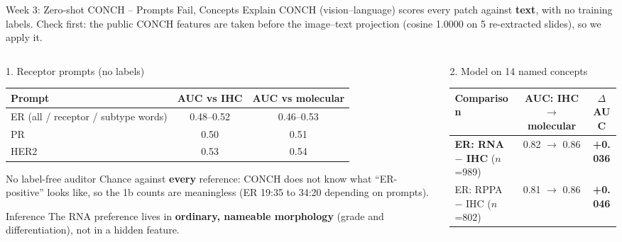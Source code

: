\documentclass[aspectratio=169,10pt]{beamer}
\begin{document}
\begin{frame}[t]{Week 3: Zero-shot CONCH -- Prompts Fail, Concepts Explain}
\footnotesize
CONCH (vision--language) scores every patch against \textbf{text}, with no training labels. Check first: the public
CONCH features are taken before the image--text projection (cosine 1.0000 on 5 re-extracted slides), so we apply it.

\vspace{4pt}
\begin{columns}[T]
\begin{column}{0.44\textwidth}
\begin{block}{1. Receptor prompts (no labels)}
\centering
\scriptsize
\begin{adjustbox}{max width=\linewidth}
\begin{tabular}{lcc}
\toprule
Prompt & AUC vs IHC & AUC vs molecular \\
\midrule
ER (all / receptor / subtype words) & 0.48--0.52 & 0.46--0.53 \\
PR & 0.50 & 0.51 \\
HER2 & 0.53 & 0.54 \\
\bottomrule
\end{tabular}
\end{adjustbox}
\end{block}
\begin{alertblock}{No label-free auditor}
Chance against \textbf{every} reference: CONCH does not know what ``ER-positive'' looks like, so the 1b counts are
meaningless (ER 19:35 to 34:20 depending on prompts).
\end{alertblock}
\begin{alertblock}{Inference}
The RNA preference lives in \textbf{ordinary, nameable morphology} (grade and differentiation), not in a hidden
feature.
\end{alertblock}
\end{column}
\begin{column}{0.53\textwidth}
\begin{block}{2. Model on 14 named concepts}
\centering
\scriptsize
\begin{adjustbox}{max width=\linewidth}
\begin{tabular}{lcc}
\toprule
Comparison & AUC: IHC $\rightarrow$ molecular & $\Delta$AUC \\
\midrule
\textbf{ER: RNA $-$ IHC} ($n$=989) & 0.82 $\rightarrow$ 0.86 & \textbf{+0.036} \\
ER: RPPA $-$ IHC ($n$=802) & 0.81 $\rightarrow$ 0.86 & \textbf{+0.046} \\

\end{tabular}
\end{adjustbox}
\end{block}
\end{column}
\end{columns}
\end{frame}
\end{document}
